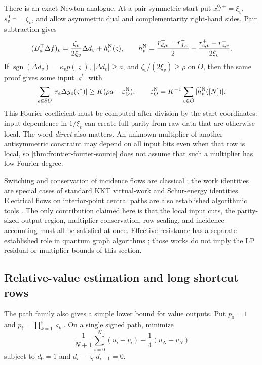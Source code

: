 There is an exact Newton analogue.  At a pair-symmetric start put
\(x_v^{0,\pm}=\xi_v\), \(s_v^{0,\pm}=\zeta_v\), and allow asymmetric dual
and complementarity right-hand sides.  Pair subtraction gives
\[
 (B_a^\top\Delta f)_v
 =\frac{\zeta_v}{2\xi_v}\Delta d_v+h_v^{\rm N}(\varsigma),
 \qquad
 h_v^{\rm N}=\frac{r_{d,v}^+-r_{d,v}^-}{2}
 -\frac{r_{c,v}^+-r_{c,v}^-}{2\xi_v}.
\]
If \(\operatorname{sgn}(\Delta d_v)=\kappa_vp(\varsigma)\),
\(|\Delta d_v|\geq a\), and \(\zeta_v/(2\xi_v)\geq\rho\) on \(O\), then
the same proof gives some input \(\varsigma^*\) with
\begin{equation}
 \sum_{e\in\partial O}|r_e\Delta y_e(\varsigma^*)|
 \geq K(\rho a-\varepsilon_O^{\rm N}),
 \qquad
 \varepsilon_O^{\rm N}=K^{-1}\sum_{v\in O}
 |\widehat h_v^{\rm N}([N])|.
 \label{eq:frontier-newton-fourier}
\end{equation}
This Fourier coefficient must be computed after division by the start
coordinates: input dependence in \(1/\xi_v\) can create full parity from
raw data that are otherwise local.  The word \emph{direct} also matters.
An unknown multiplier of another antisymmetric constraint may depend on all
input bits even when that row is local, so
\cref{thm:frontier-fourier-source} does not assume that such a
multiplier has low Fourier degree.

Switching and conservation of incidence flows are classical
\cite{harary1953-balance-signed-graph,zaslavsky2013-matrices-signed-simple-graphs};
the work identities are special cases of standard KKT virtual-work and
Schur-energy identities.  Electrical flows on interior-point central paths
are also established algorithmic tools \cite{madry2013-navigating-central-path}.
The only contribution claimed here is that the local input cuts, the
parity-sized output region, multiplier conservation, row scaling, and
incidence accounting must all be satisfied at once.  Effective resistance has a separate established role in
quantum graph algorithms
\cite{belovs2012-span-programs-st-connectivity,
jarret2018-quantum-connectivity,apers2022-quantum-speedup-for-graph-sparsification};
those works do not imply the LP residual or multiplier bounds of this
section.

\subsection{Relative-value estimation and long shortcut rows}
\label{sec:frontier-remnants}

The path family also gives a simple lower bound for value outputs.  Put
\(p_0=1\) and \(p_i=\prod_{k=1}^i\varsigma_k\).  On a single signed path,
minimize
\begin{equation}
 \frac1{N+1}\sum_{i=0}^N(u_i+v_i)
 +\frac14(u_N-v_N)
 \label{eq:frontier-relative-value-lp}
\end{equation}
subject to \(d_0=1\) and
\(d_i-\varsigma_id_{i-1}=0\).

